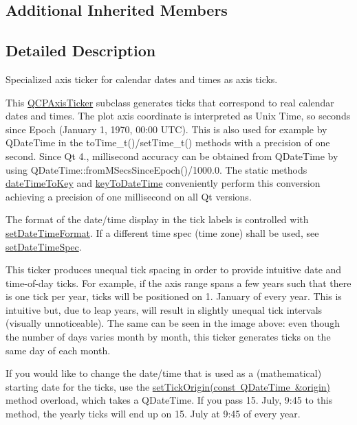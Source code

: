 \subsection*{Additional Inherited Members}


\subsection{Detailed Description}
Specialized axis ticker for calendar dates and times as axis ticks. 



This \mbox{\hyperlink{class_q_c_p_axis_ticker}{Q\+C\+P\+Axis\+Ticker}} subclass generates ticks that correspond to real calendar dates and times. The plot axis coordinate is interpreted as Unix Time, so seconds since Epoch (January 1, 1970, 00\+:00 U\+TC). This is also used for example by Q\+Date\+Time in the {\ttfamily to\+Time\+\_\+t()/set\+Time\+\_\+t()} methods with a precision of one second. Since Qt 4., millisecond accuracy can be obtained from Q\+Date\+Time by using {\ttfamily Q\+Date\+Time\+::from\+M\+Secs\+Since\+Epoch()/1000.0}. The static methods \mbox{\hyperlink{class_q_c_p_axis_ticker_date_time_aa24f293f16fff0f937bf71f4140033f1}{date\+Time\+To\+Key}} and \mbox{\hyperlink{class_q_c_p_axis_ticker_date_time_a4c1761ad057f5564804a53f942629b53}{key\+To\+Date\+Time}} conveniently perform this conversion achieving a precision of one millisecond on all Qt versions.

The format of the date/time display in the tick labels is controlled with \mbox{\hyperlink{class_q_c_p_axis_ticker_date_time_ad52660a82f688395468674d555f6a86b}{set\+Date\+Time\+Format}}. If a different time spec (time zone) shall be used, see \mbox{\hyperlink{class_q_c_p_axis_ticker_date_time_afbd987c7197e42ab61e67fb1c38abebc}{set\+Date\+Time\+Spec}}.

This ticker produces unequal tick spacing in order to provide intuitive date and time-\/of-\/day ticks. For example, if the axis range spans a few years such that there is one tick per year, ticks will be positioned on 1. January of every year. This is intuitive but, due to leap years, will result in slightly unequal tick intervals (visually unnoticeable). The same can be seen in the image above\+: even though the number of days varies month by month, this ticker generates ticks on the same day of each month.

If you would like to change the date/time that is used as a (mathematical) starting date for the ticks, use the \mbox{\hyperlink{class_q_c_p_axis_ticker_date_time_a2ea905872b8171847a49a5e093fb0c48}{set\+Tick\+Origin(const Q\+Date\+Time \&origin)}} method overload, which takes a Q\+Date\+Time. If you pass 15. July, 9\+:45 to this method, the yearly ticks will end up on 15. July at 9\+:45 of every year.

